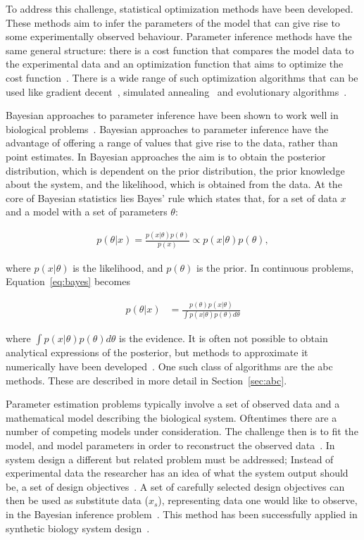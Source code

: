 To address this challenge, statistical optimization methods have been developed. These methods aim to infer the parameters of the model that can give rise to some experimentally observed behaviour. Parameter inference methods have the same general structure: there is a cost function that compares the model data to the experimental data and an optimization function that aims to optimize the cost function~\autocite{Toni:2010}. There is a wide range of such optimization algorithms that can be used like gradient decent~\autocite{Levenberg:1944we, Marquardt:1963wr}, simulated annealing~\autocite{Kirkpatrick:1983kv} and evolutionary algorithms~\autocite{Onbasoglu:2001um, Wood:2002uo}.  

Bayesian approaches to parameter inference have been shown to work well in biological problems~\autocite{Barnes:2011hh, Toni:2010, Liepe:2014iw}. Bayesian approaches to parameter inference have the advantage of offering a range of values that give rise to the data, rather than point estimates. In Bayesian approaches the aim is to obtain the posterior distribution, which is dependent on the prior distribution, the prior knowledge about the system, and the likelihood, which is obtained from the data. At the core of Bayesian statistics lies Bayes' rule which states that, for a set of data $x$ and a model with a set of parameters $θ$:

\begin{align}
	p(θ|x) = \frac{p(x|θ)p(θ)}{p(x)} \propto p(x|θ)p(θ), \label{eq:bayes}
\end{align}



\noindent where $p(x|θ)$ is the likelihood, and $p(θ)$ is the prior. In continuous problems, Equation~\ref{eq:bayes} becomes

\begin{align}%
	p(θ|x) &= \frac{p(θ)p(x|θ)}{\int p(x|θ)p(θ)dθ}
\end{align}


\noindent where $\displaystyle \int p(x|θ)p(θ)dθ$ is the evidence. It is often not possible to obtain analytical expressions of the posterior, but methods to approximate it numerically have been developed~\autocite{Barnes:2011bk}. One such class of algorithms are the \acrfull{abc} methods. These are described in more detail in Section~\ref{sec:abc}.


Parameter estimation problems typically involve a set of observed data and a mathematical model describing the biological system. Oftentimes there are a number of competing models under consideration. The challenge then is to fit the model, and model parameters in order to reconstruct the observed data~\autocite{Ma:2009ig}. In system design a different but related problem must be addressed; Instead of experimental data the researcher has an idea of what the system output should be, a set of design objectives~\autocite{Barnes:2011bk}. A set of carefully selected design objectives can then be used as substitute data ($x_s$), representing data one would like to observe, in the Bayesian inference problem~\autocite{Barnes:2011bk}. This method has been successfully applied in synthetic biology system design~\autocite{Barnes:2011hh, Woods:2016eh}. 

